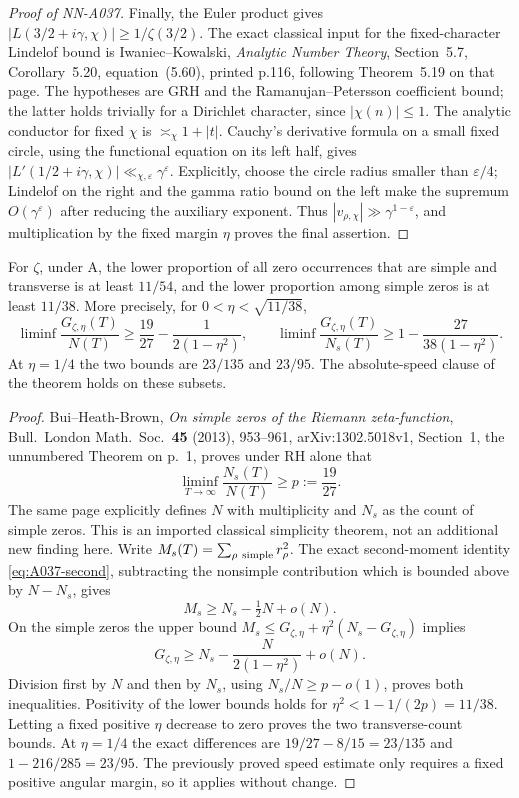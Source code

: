 \begin{proof}[Proof of NN-A037]
Finally, the Euler product gives
$|L(3/2+i\gamma,\chi)|\ge1/\zeta(3/2)$. The exact classical input
for the fixed-character Lindelof bound is Iwaniec--Kowalski,
\emph{Analytic Number Theory}, Section~5.7, Corollary~5.20,
equation~(5.60), printed p.116, following Theorem~5.19 on that page.
The hypotheses are GRH and the Ramanujan--Petersson coefficient
bound; the latter holds trivially for a Dirichlet character, since
$|\chi(n)|\le1$. The analytic conductor for fixed $\chi$ is
$\asymp_\chi 1+|t|$. Cauchy's derivative formula on a small
fixed circle, using the functional equation on its left half, gives
$|L'(1/2+i\gamma,\chi)|\ll_{\chi,\varepsilon}\gamma^\varepsilon$.
Explicitly, choose the circle radius smaller than $\varepsilon/4$;
Lindelof on the right and the gamma ratio bound on the left make the
supremum $O(\gamma^\varepsilon)$ after reducing the auxiliary exponent.
Thus $|v_{\rho,\chi}|\gg\gamma^{1-\varepsilon}$, and multiplication
by the fixed margin $\eta$ proves the final assertion.
\end{proof}

\begin{corollary}
\label{cor:A037-zeta-sharpening}
For $\zeta$, under A, the lower proportion of all zero occurrences
that are simple and transverse is at least $11/54$, and the lower
proportion among simple zeros is at least $11/38$. More precisely,
for $0<\eta<\sqrt{11/38}$,
\[
 \liminf\frac{G_{\zeta,\eta}(T)}{N(T)}
       \ge\frac{19}{27}-\frac1{2(1-\eta^2)},\qquad
 \liminf\frac{G_{\zeta,\eta}(T)}{N_s(T)}
       \ge1-\frac{27}{38(1-\eta^2)}.
\]
At $\eta=1/4$ the two bounds are $23/135$ and $23/95$.
The absolute-speed clause of the theorem holds on these subsets.
\end{corollary}

\begin{proof}
Bui--Heath-Brown, \emph{On simple zeros of the Riemann
zeta-function}, Bull.\ London Math.\ Soc.\ \textbf{45} (2013),
953--961, arXiv:1302.5018v1, Section~1, the unnumbered Theorem
on p.~1, proves under RH alone that
\[
                \liminf_{T\to\infty}\frac{N_s(T)}{N(T)}
                   \ge p:=\frac{19}{27}.
\]
The same page explicitly defines $N$ with multiplicity and $N_s$
as the count of simple zeros. This is an imported classical
simplicity theorem, not an additional new finding here.
Write $M_s(T)=\sum_{\rho\ {\rm simple}}r_\rho^2$. The exact
second-moment identity \eqref{eq:A037-second}, subtracting the
nonsimple contribution which is bounded above by $N-N_s$, gives
\[
                   M_s\ge N_s-\tfrac12N+o(N).
\]
On the simple zeros the upper bound
$M_s\le G_{\zeta,\eta}+\eta^2(N_s-G_{\zeta,\eta})$ implies
\[
 G_{\zeta,\eta}\ge N_s-\frac{N}{2(1-\eta^2)}+o(N).
\]
Division first by $N$ and then by $N_s$, using $N_s/N\ge p-o(1)$,
proves both inequalities. Positivity of the lower bounds holds
for $\eta^2<1-1/(2p)=11/38$. Letting a fixed positive $\eta$
decrease to zero proves the two transverse-count bounds.
At $\eta=1/4$ the exact differences are
$19/27-8/15=23/135$ and $1-216/285=23/95$.
The previously proved speed estimate only requires a fixed positive
angular margin, so it applies without change.
\end{proof}

